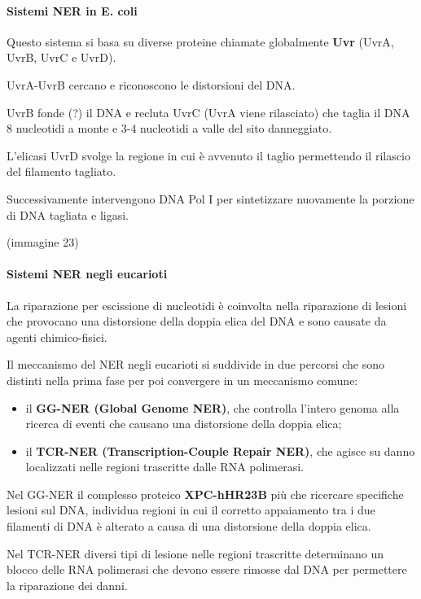 \documentclass[11pt]{book}
\begin{document}
\paragraph{Sistemi NER in E. coli}\label{sistemi-ner-in-e.-coli}

Questo sistema si basa su diverse proteine chiamate globalmente
\textbf{Uvr} (UvrA, UvrB, UvrC e UvrD).

UvrA-UvrB cercano e riconoscono le distorsioni del DNA.

UvrB fonde (?) il DNA e recluta UvrC (UvrA viene rilasciato) che taglia
il DNA 8 nucleotidi a monte e 3-4 nucleotidi a valle del sito
danneggiato.

L'elicasi UvrD svolge la regione in cui è avvenuto il taglio permettendo
il rilascio del filamento tagliato.

Successivamente intervengono DNA Pol I per sintetizzare nuovamente la
porzione di DNA tagliata e ligasi.

(immagine 23)

\paragraph{Sistemi NER negli
eucarioti}\label{sistemi-ner-negli-eucarioti}

La riparazione per escissione di nucleotidi è coinvolta nella
riparazione di lesioni che provocano una distorsione della doppia elica
del DNA e sono causate da agenti chimico-fisici.

Il meccanismo del NER negli eucarioti si suddivide in due percorsi che
sono distinti nella prima fase per poi convergere in un meccanismo
comune:

\begin{itemize}
\itemsep1pt\parskip0pt
\item
  il \textbf{GG-NER (Global Genome NER)}, che controlla l'intero genoma
  alla ricerca di eventi che causano una distorsione della doppia elica;
\item
  il \textbf{TCR-NER (Transcription-Couple Repair NER)}, che agisce su
  danno localizzati nelle regioni trascritte dalle RNA polimerasi.
\end{itemize}

Nel GG-NER il complesso proteico \textbf{XPC-hHR23B} più che ricercare
specifiche lesioni sul DNA, individua regioni in cui il corretto
appaiamento tra i due filamenti di DNA è alterato a causa di una
distorsione della doppia elica.

Nel TCR-NER diversi tipi di lesione nelle regioni trascritte determinano
un blocco delle RNA polimerasi che devono essere rimosse dal DNA per
permettere la riparazione dei danni.
\end{document}
